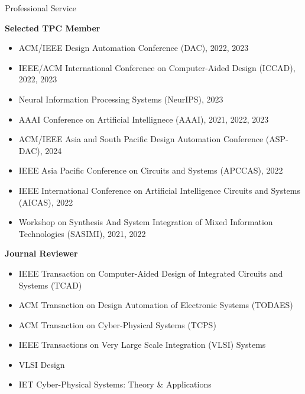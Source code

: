 
\begin{rSection}{Professional Service}

\textbf{Selected TPC Member}
\begin{itemize}
    \item ACM/IEEE Design Automation Conference (DAC), 2022, 2023
    \item IEEE/ACM International Conference on Computer-Aided Design (ICCAD), 2022, 2023
    \item Neural Information Processing Systems (NeurIPS), 2023
    \item AAAI Conference on Artificial Intellignece (AAAI), 2021, 2022, 2023
    \item ACM/IEEE Asia and South Pacific Design Automation Conference (ASP-DAC), 2024
    \item IEEE Asia Pacific Conference on Circuits and Systems (APCCAS), 2022
    \item IEEE International Conference on Artificial Intelligence Circuits and Systems (AICAS), 2022
    \item Workshop on Synthesis And System Integration of Mixed Information Technologies (SASIMI), 2021, 2022
\end{itemize}


\textbf{Journal Reviewer}
\begin{itemize}
    \item IEEE Transaction on Computer-Aided Design of Integrated Circuits and Systems (TCAD)
    \item ACM Transaction on Design Automation of Electronic Systems (TODAES)
    \item ACM Transaction on Cyber-Physical Systems (TCPS)
    \item IEEE Transactions on Very Large Scale Integration (VLSI) Systems
    \item VLSI Design
    \item IET Cyber-Physical Systems: Theory \& Applications
\end{itemize}


\end{rSection}
